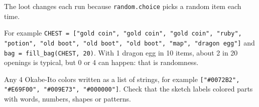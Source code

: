 \begin{answer}
The loot changes each run because \texttt{random.choice} picks a random item each time.
\end{answer}

\begin{answer}
For example \texttt{CHEST = ["gold coin", "gold coin", "gold coin", "ruby", "potion", "old boot", "old boot", "old boot", "map", "dragon egg"]}
and \texttt{bag = fill\_bag(CHEST, 20)}. With 1 dragon egg in 10 items, about 2 in 20 openings is typical, but 0 or 4 can happen:
that is randomness.
\end{answer}

\begin{answer}
Any 4 Okabe-Ito colors written as a list of strings, for example \texttt{["\#0072B2", "\#E69F00", "\#009E73", "\#000000"]}.
Check that the sketch labels colored parts with words, numbers, shapes or patterns.
\end{answer}
